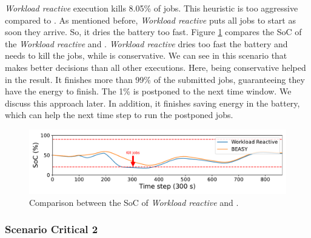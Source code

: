 \emph{Workload reactive} execution kills 8.05\% of jobs. This heuristic is too aggressive compared to \emph{\systemName}. As mentioned before, \emph{Workload reactive} puts all jobs to start as soon they arrive. So, it dries the battery too fast. Figure \ref{fig:critical_soc_s1} compares the SoC of the \emph{Workload reactive} and \emph{\systemName}. \emph{Workload reactive} dries too fast the battery and needs to kill the jobs, while \emph{\systemName} is conservative. We can see in this scenario that \emph{\systemName} makes better decisions than all other executions. Here, being conservative helped in the result. It finishes more than 99\% of the submitted jobs, guaranteeing they have the energy to finish. The 1\% is postponed to the next time window. We discuss this approach later. In addition, it finishes saving energy in the battery, which can help the next time step to run the postponed jobs.

\begin{figure}[!htb]
    \centering
    \includegraphics[scale=0.5]{Images/Heuristic/critical_soc_s1.pdf}
    \caption{Comparison between the SoC of \emph{Workload reactive} and \emph{\systemName}.}
    \label{fig:critical_soc_s1}
\end{figure}

\clearpage

\subsubsection{Scenario Critical 2}

